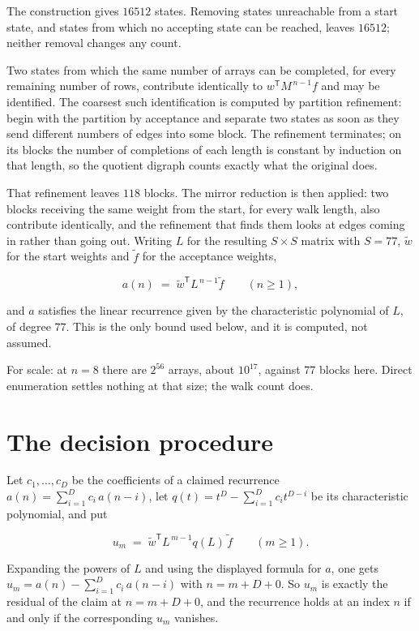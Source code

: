 \documentclass[11pt]{article}
\theoremstyle{definition}
\begin{document}
The construction gives $16512$ states. Removing states unreachable from a start state, and states from which no accepting state can be reached, leaves $16512$; neither removal changes any count.

Two states from which the same number of arrays can be completed, for every remaining number of rows, contribute identically to $w^{\mathsf T}M^{\,n-1}f$ and may be identified. The coarsest such identification is computed by partition refinement: begin with the partition by acceptance and separate two states as soon as they send different numbers of edges into some block. The refinement terminates; on its blocks the number of completions of each length is constant by induction on that length, so the quotient digraph counts exactly what the original does.

That refinement leaves $118$ blocks. The mirror reduction is then applied: two blocks receiving the same weight from the start, for every walk length, also contribute identically, and the refinement that finds them looks at edges coming in rather than going out. Writing $L$ for the resulting $S \times S$ matrix with $S = 77$, $\tilde w$ for the start weights and $\tilde f$ for the acceptance weights,

\[a(n) \;=\; \tilde w^{\mathsf T} L^{\,n-1} \tilde f \qquad (n \ge 1),\]

and $a$ satisfies the linear recurrence given by the characteristic polynomial of $L$, of degree $77$. This is the only bound used below, and it is computed, not assumed.

For scale: at $n = 8$ there are $2^{56}$ arrays, about $10^{17}$, against $77$ blocks here. Direct enumeration settles nothing at that size; the walk count does.

\section{The decision procedure}

Let $c_1,\dots,c_D$ be the coefficients of a claimed recurrence $a(n) = \sum_{i=1}^{D} c_i\,a(n-i)$, let $q(t) = t^{D} - \sum_{i=1}^{D} c_i t^{D-i}$ be its characteristic polynomial, and put

\[u_m \;=\; \tilde w^{\mathsf T} L^{\,m-1} q(L)\,\tilde f \qquad (m \ge 1).\]

Expanding the powers of $L$ and using the displayed formula for $a$, one gets $u_m = a(n) - \sum_{i=1}^{D} c_i\,a(n-i)$ with $n = m + D + 0$. So $u_m$ is exactly the residual of the claim at $n = m + D + 0$, and the recurrence holds at an index $n$ if and only if the corresponding $u_m$ vanishes.
\end{document}
